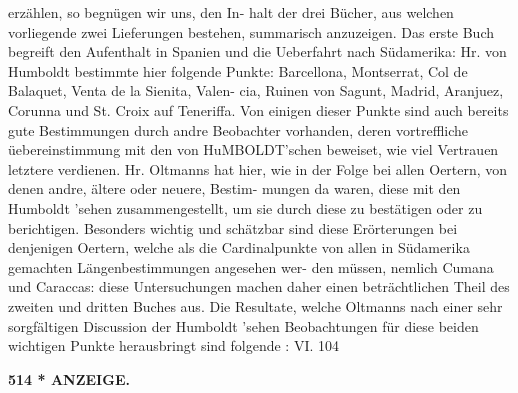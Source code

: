 \documentclass[12pt,a4paper]{article}
\begin{document}
 erzählen,  so  begnügen  wir  uns,  den  In- halt der  drei  Bücher,  aus  welchen  vorliegende  zwei  Lieferungen  bestehen,  summarisch  anzuzeigen.  Das erste  Buch  begreift  den  Aufenthalt  in  Spanien  und  die  Ueberfahrt  nach  Südamerika:  Hr. von  Humboldt bestimmte  hier  folgende  Punkte:  Barcellona,  Montserrat,  Col  de  Balaquet,  Venta  de  la  Sienita,  Valen- cia, Ruinen  von  Sagunt,  Madrid,  Aranjuez,  Corunna  und  St.  Croix  auf  Teneriffa.  Von  einigen  dieser Punkte  sind  auch  bereits  gute  Bestimmungen  durch  andre  Beobachter  vorhanden,  deren  vortreffliche üebereinstimmung  mit  den  von  HuMBOLDT'schen  beweiset,  wie  viel  Vertrauen  letztere  verdienen.  Hr. Oltmanns  hat  hier,  wie  in  der  Folge  bei  allen  Oertern,  von  denen  andre,  ältere  oder  neuere,  Bestim- mungen da  waren,  diese  mit  den  Humboldt 'sehen  zusammengestellt,  um  sie  durch  diese  zu  bestätigen oder  zu  berichtigen.  Besonders  wichtig  und  schätzbar  sind  diese  Erörterungen  bei  denjenigen  Oertern, welche  als  die  Cardinalpunkte  von  allen  in  Südamerika  gemachten  Längenbestimmungen  angesehen  wer- den müssen,  nemlich  Cumana  und  Caraccas:  diese  Untersuchungen  machen  daher  einen  beträchtlichen Theil  des  zweiten  und  dritten  Buches  aus.  Die  Resultate,  welche  Oltmanns  nach  einer  sehr  sorgfältigen Discussion  der  Humboldt 'sehen  Beobachtungen  für  diese  beiden  wichtigen  Punkte  herausbringt  sind  folgende : VI.  104

\vspace{0.5em}


\noindent\textbf{514  *  ANZEIGE.}
\end{document}
